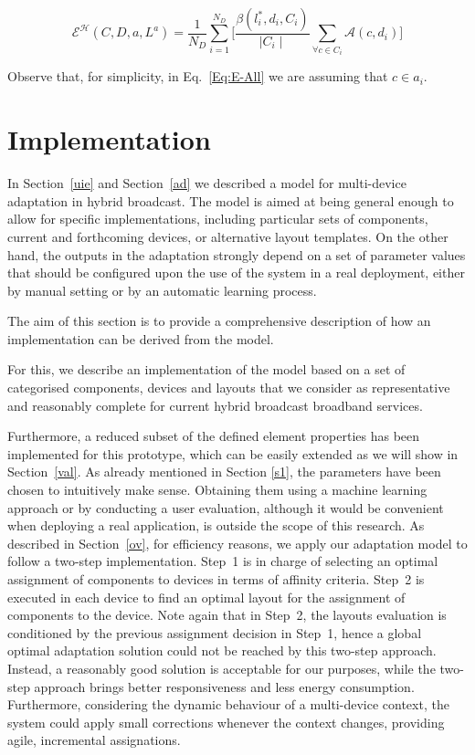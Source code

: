 \begin{equation} \label{Eq:E-All}
\mathcal{E}^{\mathcal{H}}(C,D,a, L^a) = \frac{1}{N_D} \sum_{i=1}^{N_D}\Big[\frac{\beta(l^*_i,d_i,C_i)}{\mid C_i \mid} \sum_{\forall c \in C_i} \mathcal{A}(c,d_i)\Big]
\end{equation} 

Observe that, for simplicity, in Eq.~\ref{Eq:E-All} we are assuming that $c \in a_i$.


\section{Implementation}\label{imp}

In Section~\ref{uie} and Section~\ref{ad} we described a model for multi-device adaptation in hybrid broadcast. 
The model is aimed at being general enough to allow for specific implementations, including particular sets of components, current and forthcoming devices, or alternative layout templates. 
On the other hand, the outputs in the adaptation strongly depend on a set of parameter values that should be configured upon the use of the system in a real deployment, either by manual setting or by an automatic learning process.

The aim of this section is to provide a comprehensive description of how an implementation can be derived from the model. 

For this, we describe an implementation of the model based on a set of categorised components, devices and layouts that we consider as representative and reasonably complete for current hybrid broadcast broadband services.

Furthermore, a reduced subset of the defined element properties has been implemented for this prototype, which can be easily extended as we will show in Section~\ref{val}.
As already mentioned in Section \ref{s1}, the parameters have been chosen to intuitively make sense. Obtaining them using a machine learning approach or by conducting a user evaluation, although it would be convenient when deploying a real application, is outside the scope of this research. 
As described in Section~\ref{ov}, for efficiency reasons, we apply our adaptation model to follow a two-step implementation. 
Step~1 is in charge of selecting an optimal assignment of components to devices in terms of affinity criteria.
Step~2 is executed in each device to find an optimal layout for the assignment of components to the device. 
Note again that in Step~2, the layouts evaluation is conditioned by the previous assignment decision in Step~1, hence a global optimal adaptation solution could not be reached by this two-step approach. 
Instead, a reasonably good solution is acceptable for our purposes, while the two-step approach brings better responsiveness and less energy consumption.
Furthermore, considering the dynamic behaviour of a multi-device context, the system could apply small corrections whenever the context changes, providing  agile, incremental assignations.

